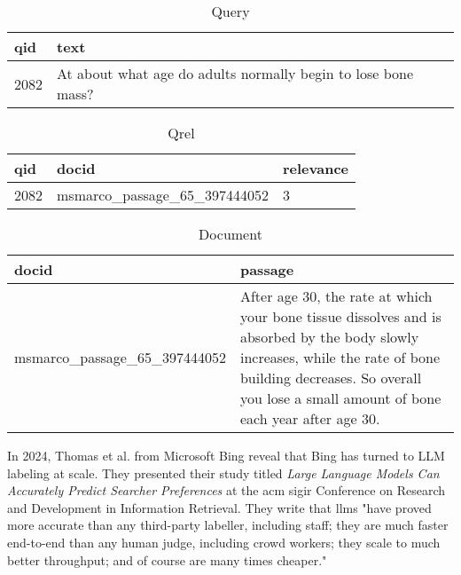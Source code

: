 \begin{table}[H]
\centering
\caption{Query}
\label{tab:example-query}
\begin{tabularx}{\linewidth}{lX}
\toprule
\textbf{qid} & \textbf{text} \\
\midrule
2082 & At about what age do adults normally begin to lose bone mass? \\
\bottomrule
\end{tabularx}
\end{table}

\begin{table}[H]
\centering
\caption{Qrel}
\label{tab:example-qrel}
\begin{tabularx}{\linewidth}{lll}
\toprule
\textbf{qid} & \textbf{docid} & \textbf{relevance} \\
\midrule
2082 & msmarco\_passage\_65\_397444052 & 3 \\
\bottomrule
\end{tabularx}
\end{table}

\begin{table}[H]
\centering
\caption{Document}
\label{tab:example-doc}
\begin{tabularx}{\linewidth}{lX}
\toprule
\textbf{docid} & \textbf{passage} \\
\midrule
msmarco\_passage\_65\_397444052 & After age 30, the rate at which your bone tissue dissolves and is absorbed by the body slowly increases, while the rate of bone building decreases. So overall you lose a small amount of bone each year after age 30. \\
\bottomrule
\end{tabularx}
\end{table}

In 2024, Thomas et al. from Microsoft Bing reveal that Bing has turned to LLM labeling at scale. They presented their study titled \textit{Large Language Models Can Accurately Predict Searcher Preferences} at the \gls{acm} \gls{sigir} Conference on Research and Development in Information Retrieval. They write that \glspl{llm} "have proved more accurate than any third-party labeller, including staff; they are much faster end-to-end than any human judge, including crowd
workers; they scale to much better throughput; and of course are many times cheaper." 

